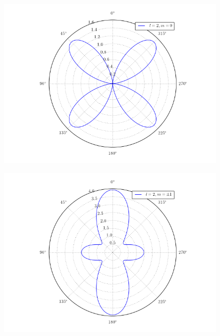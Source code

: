 \documentclass[a4paper,11pt]{article}
\numberwithin{equation}{section}
\begin{document}
\begin{figure}[H]
 \center
 \includegraphics[scale=0.6]{problema3fig4}
\end{figure}

\begin{figure}[H]
 \center
 \includegraphics[scale=0.6]{problema3fig5}
\end{figure}
\end{document}
